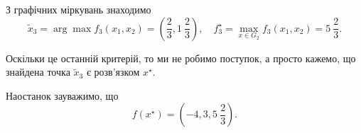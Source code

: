 \begin{solution}
    З графічних міркувань знаходимо \[ \tilde x_3 = \arg \max f_3(x_1, x_2) = \left(\frac23, 1\ \frac23\right), \quad f_3^\star = \max_{x \in G_2} f_3(x_1, x_2) = 5\ \frac23. \]
    
    Оскільки це останній критерій, то ми не робимо поступок, а просто кажемо, що знайдена точка $\tilde x_3$ є розв'язком $x^\star$. \medskip
    
    Наостанок зауважимо, що \[ f(x^\star) = \left(-4, 3, 5\ \frac23\right).\]
\end{solution}

\newpage